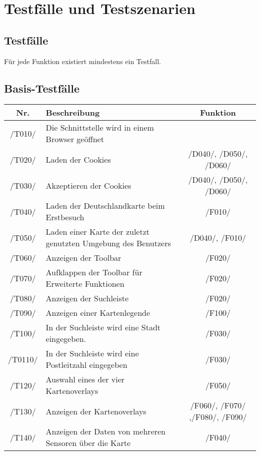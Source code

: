 \section{Testfälle und Testszenarien}
\subsection{Testfälle}

Für jede Funktion existiert mindestens ein Testfall.
\newline
\subsection{Basis-Testfälle}
\begin{tabularx}{\textwidth}{| c | X | c |}
	\hline
	\textbf{Nr.} & 
    \textbf{Beschreibung} &
    \textbf{Funktion}\\
    \hline
     /T010/ & Die Schnittstelle wird in einem Browser geöffnet & \\
     \hline
     /T020/ & Laden der Cookies & /D040/, /D050/, /D060/\\
     \hline
     /T030/ & Akzeptieren der Cookies &  /D040/, /D050/, /D060/\\
     \hline
     /T040/ & Laden der Deutschlandkarte beim Erstbesuch& /F010/\\
     \hline
     /T050/ & Laden einer Karte der zuletzt genutzten Umgebung des Benutzers & /D040/, /F010/\\
     \hline
     /T060/ & Anzeigen der Toolbar & /F020/\\
     \hline
     /T070/ & Aufklappen der Toolbar für Erweiterte Funktionen & /F020/\\
     \hline
     /T080/ & Anzeigen der Suchleiste & /F020/\\
     \hline
     /T090/ & Anzeigen einer Kartenlegende & /F100/\\
     \hline
     /T100/ & In der Suchleiste wird eine Stadt eingegeben. & /F030/\\
     \hline
     /T0110/ & In der Suchleiste wird eine Postleitzahl eingegeben &  /F030/\\
     \hline
     /T120/ & Auswahl eines der vier Kartenoverlays & /F050/\\
     \hline
     /T130/ & Anzeigen der Kartenoverlays & /F060/, /F070/ ,/F080/, /F090/ \\
     \hline
     /T140/ & Anzeigen der Daten von mehreren Sensoren über die Karte & /F040/\\

\end{tabularx}
